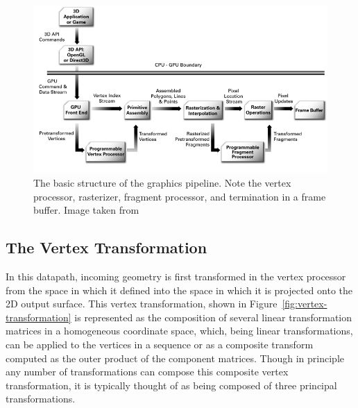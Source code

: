 \begin{figure}[ht!]
\centering
\includegraphics[width=1.0\textwidth]{images/graphics-pipeline.png}
\caption{The basic structure of the graphics pipeline. Note the vertex processor, rasterizer, fragment processor, and termination in a frame buffer. Image taken from  \protect\cite{pipeline-image-ref}}
\label{fig:graphics-pipeline}
\end{figure}


\subsection{The Vertex Transformation}
\label{sec:vertex-transform}
In this datapath, incoming geometry is first transformed in the vertex processor from the space in which it defined into the space in which it is projected onto the 2D output surface. This vertex transformation, shown in Figure~\ref{fig:vertex-transformation} is represented as the composition of several linear transformation matrices in a homogeneous coordinate space, which, being linear transformations, can be applied to the vertices in a sequence or as a composite transform computed as the outer product of the component matrices. Though in principle any number of transformations can compose this composite vertex transformation, it is typically thought of as being composed of three principal transformations. 

